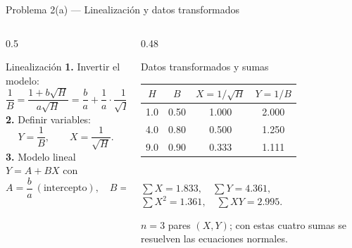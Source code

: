 \documentclass[aspectratio=169,10pt]{beamer}
\begin{document}
\begin{frame}{Problema 2(a) — Linealización y datos transformados}
\begin{columns}[T]
\begin{column}{0.5\textwidth}
\begin{cardgear}{Linealización}{\faSuperscript}
{\footnotesize
\textbf{1.} Invertir el modelo:
\[
\frac1B=\frac{1+b\sqrt H}{a\sqrt H}=\frac{b}{a}+\frac1a\cdot\frac1{\sqrt H}.
\]
\textbf{2.} Definir variables:
\[
Y=\frac1B,\qquad X=\frac1{\sqrt H}.
\]
\textbf{3.} Modelo lineal $Y=A+BX$ con
\[
A=\frac ba\ (\text{intercepto}),\quad B=\frac1a\ (\text{pendiente}).
\]}
\end{cardgear}
\end{column}
\begin{column}{0.48\textwidth}
\begin{cardgear}{Datos transformados y sumas}{\faTable}
\centering
{\footnotesize\renewcommand{\arraystretch}{1.28}\setlength{\tabcolsep}{6pt}
\begin{tabular}{cc|cc}
$H$ & $B$ & $X=1/\sqrt H$ & $Y=1/B$\\\hline
1.0 & 0.50 & 1.000 & 2.000\\
4.0 & 0.80 & 0.500 & 1.250\\
9.0 & 0.90 & 0.333 & 1.111\\
\end{tabular}}\\[1.4mm]
{\footnotesize
$\textstyle\sum X=1.833,\quad \sum Y=4.361,$\\[0.6mm]
$\textstyle\sum X^2=1.361,\quad \sum XY=2.995.$}
\end{cardgear}
\vspace{1mm}
\begin{cardnota}[\faInfoCircle]
{\footnotesize $n=3$ pares $(X,Y)$; con estas cuatro sumas se resuelven las ecuaciones normales.}
\end{cardnota}
\end{column}
\end{columns}
\end{frame}
\end{document}
